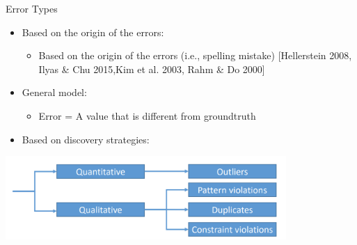 \documentclass[aspectratio=169]{../latex_main/tntbeamer}  %
\begin{document}
\begin{frame}{Error Types}
    \begin{itemize}
        \item Based on the origin of the errors:
        \begin{itemize}
            \item Based on the origin of the errors (i.e., spelling mistake) [Hellerstein 2008, Ilyas \& Chu 2015,Kim et al. 2003, Rahm \& Do 2000]
        \end{itemize}
        \item General model: 
        \begin{itemize}
            \item Error = A value that is different from groundtruth
        \end{itemize}
        \item Based on discovery strategies:
    \end{itemize}

    \centering
\includegraphics[width=0.8\textwidth]{figure/bild16_class_error.png}
    
\end{frame}
\end{document}

